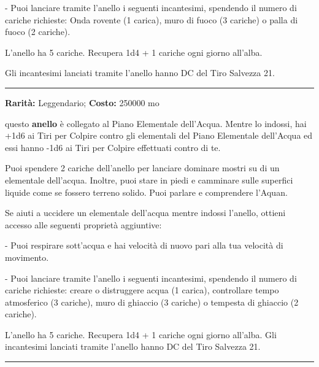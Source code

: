 \begin{multicols}{2}
\smallskip- Puoi lanciare tramite l'anello i seguenti incantesimi, spendendo il numero di cariche richieste: Onda rovente (1 carica), muro di fuoco (3 cariche) o palla di fuoco (2 cariche).

\medskip

L'anello ha 5 cariche. Recupera 1d4 + 1 cariche ogni giorno all'alba.

Gli incantesimi lanciati tramite l'anello hanno DC del Tiro Salvezza 21.

\smallskip\noindent\rule{\linewidth}{2pt}  \hypertarget{AnellodegliElementalidell'Acqua}{}\medskip{}\noindent\label{AnellodegliElementalidell'Acqua}

\textbf{Rarità:} Leggendario; \textbf{Costo:} 250000 mo

questo \textbf{anello} è collegato al Piano Elementale dell'Acqua. Mentre lo indossi, hai +1d6 ai Tiri per Colpire contro gli elementali del Piano Elementale dell'Acqua ed essi hanno -1d6 ai Tiri per Colpire effettuati contro di te.

Puoi spendere 2 cariche dell'anello per lanciare dominare mostri su di un elementale dell'acqua. Inoltre, puoi stare in piedi e camminare sulle superfici liquide come se fossero terreno solido. Puoi parlare e comprendere l'Aquan.

Se aiuti a uccidere un elementale dell'acqua mentre indossi l'anello, ottieni accesso alle seguenti proprietà aggiuntive:

\smallskip- Puoi respirare sott'acqua e hai velocità di nuovo pari alla tua velocità di movimento.

\smallskip- Puoi lanciare tramite l'anello i seguenti incantesimi, spendendo il numero di cariche richieste: creare o distruggere acqua (1 carica), controllare tempo atmosferico (3 cariche), muro di ghiaccio (3 cariche) o tempesta di ghiaccio (2 cariche).

\medskip
L'anello ha 5 cariche. Recupera 1d4 + 1 cariche ogni giorno all'alba. Gli incantesimi lanciati tramite l'anello hanno DC del Tiro Salvezza 21.

\smallskip\noindent\rule{\linewidth}{2pt}  \hypertarget{AnellodegliElementalidell'Aria}{}\medskip{}\noindent\label{AnellodegliElementalidell'Aria}


\end{multicols}

